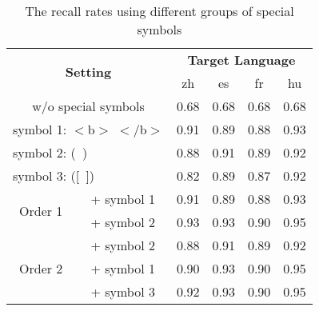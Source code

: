 \begin{table}[t]
    \centering
    \caption{The recall rates using different groups of special symbols}
    \label{tab:stat_symbol_translation}
    \vskip 0.15in
    \scriptsize
    \begin{tabular}{cc|cccc}
        \toprule
         \multicolumn{2}{c|}{\multirow{2}{*}{\textbf{Setting}}} & \multicolumn{4}{c}{\textbf{Target Language}}   \\
         & & zh & es & fr & hu \\
         \midrule
         \multicolumn{2}{c|}{w/o special symbols} & 0.68 & 0.68 & 0.68 & 0.68 
         \\
         \multicolumn{2}{l|}{symbol 1: $<$b$>$ $<$/b$>$} & 0.91 & 0.89 & 0.88 & 0.93 \\
         \multicolumn{2}{l|}{symbol 2: (\texttt{ })} & 0.88 & 0.91 & 0.89 & 0.92 \\
         \multicolumn{2}{l|}{symbol 3: ([\texttt{ }])} & 0.82 & 0.89 & 0.87 & 0.92 \\
        \midrule
         \multirow{2}{*}{Order 1} & + symbol 1 & 0.91 & 0.89 & 0.88 & 0.93 \\
         & + symbol 2 & 0.93 & 0.93 & 0.90 & 0.95 \\
         \midrule
        \multirow{3}{*}{Order 2} & + symbol 2 & 0.88 & 0.91 & 0.89 & 0.92 \\
        & + symbol 1 & 0.90 & 0.93 & 0.90 & 0.95 \\
        & + symbol 3 & 0.92 & 0.93 & 0.90 & 0.95 \\
         \bottomrule
    \end{tabular}
\end{table}




